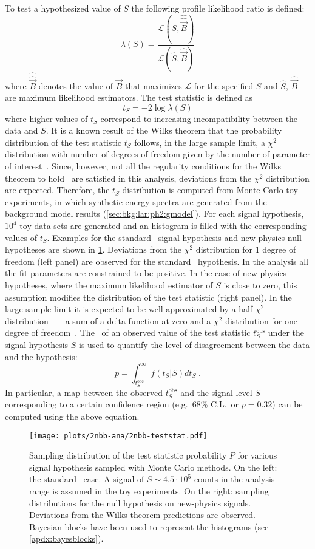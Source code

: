 To test a hypothesized value of $S$ the following profile likelihood ratio is defined:
\[
  \lambda(S) = \frac{\mathcal{L}(S, \hat{\hat{\vec{B}}})}{\mathcal{L}(\hat{S}, \hat{\vec{B}})}
\]
where $\hat{\hat{\vec{B}}}$ denotes the value of $\vec{B}$ that maximizes $\mathcal{L}$
for the specified $S$ and $\hat{S}$, $\hat{\vec{B}}$ are maximum likelihood
estimators. The test statistic is defined as
\[
  t_S = -2\log\lambda(S)
\]
where higher values of $t_S$ correspond to increasing incompatibility between the data and
$S$. It is a known result of the Wilks theorem that the probability distribution of the
test statistic $t_S$ follows, in the large sample limit, a $\chi^2$ distribution with
number of degrees of freedom given by the number of parameter of
interest~\cite{Cowan2011}.  Since, however, not all the regularity conditions for the
Wilks theorem to hold~\cite{Algeri2020} are satisfied in this analysis, deviations from
the $\chi^2$ distribution are expected. Therefore, the $t_S$ distribution is computed from
Monte Carlo toy experiments, in which synthetic energy spectra are generated from the
background model results (\cref{sec:bkg:lar:ph2:gmodel}). For each signal hypothesis,
$10^4$ toy data sets are generated and an histogram is filled with the corresponding
values of $t_S$. Examples for the standard \nnbb\ signal hypothesis and new-physics
null hypotheses are shown in \cref{fig:2nbb-ana:ts-dist}. Deviations from the $\chi^2$
distribution for 1 degree of freedom (left panel) are observed for the standard \nnbb\
hypothesis. In the analysis all the fit parameters are constrained to be positive. In the
case of new physics hypotheses, where the maximum likelihood estimator of $S$ is close to
zero, this assumption modifies the distribution of the test statistic (right panel). In
the large sample limit it is expected to be well approximated by a half-$\chi^2$
distribution~---~a sum of a delta function at zero and a $\chi^2$ distribution for one
degree of freedom~\cite{Chernoff1954}.
\newpar
The \pvalue\ of an observed value of the test statistic $t_S^\text{obs}$ under the signal
hypothesis $S$ is used to quantify the level of disagreement between the data and the
hypothesis:
\[
  p = \int_{t_S^\text{obs}}^\infty f(t_S | S) dt_S \;.
\]
In particular, a map between the observed $t_S^\text{obs}$ and the signal level $S$
corresponding to a certain confidence region (e.g.~68\% C.L.~or $p=0.32$) can be computed
using the above equation.

\begin{figure}
  \centering
  \texttt{[image: plots/2nbb-ana/2nbb-teststat.pdf]}
  \caption{%
    Sampling distribution of the test statistic probability $P$ for various signal
    hypothesis sampled with Monte Carlo methods. On the left: the standard \nnbb\ case. A
    signal of $S \sim 4.5 \cdot 10^5$ counts in the analysis range is assumed in the toy
    experiments. On the right: sampling distributions for the null hypothesis on
    new-physics signals.  Deviations from the Wilks theorem predictions are observed.
    Bayesian blocks have been used to represent the histograms (see
    \cref{apdx:bayesblocks}). \fillme{update, add LV}
  }\label{fig:2nbb-ana:ts-dist}
\end{figure}

